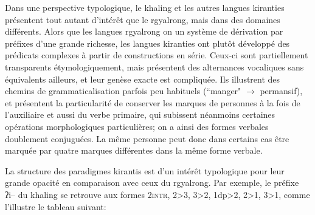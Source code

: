 \documentclass[oldfontcommands,oneside,a4paper,11pt]{memoir}
\newcommand{\ipa}[1]{{\phon #1}} %
\begin{document}
Dans une perspective typologique, le khaling et les autres langues kiranties présentent tout autant d'intérêt que le rgyalrong, mais dans des domaines différents. Alors que les langues rgyalrong on un système de dérivation par préfixes  d'une grande richesse, les langues kiranties ont plutôt développé des prédicats complexes à partir de constructions en série. Ceux-ci sont partiellement transparents étymologiquement, mais présentent des alternances vocaliques sans équivalents ailleurs, et leur genèse exacte est compliquée. Ils illustrent des chemins de grammaticalisation parfois peu habituels (``manger" $\rightarrow$ permansif), et présentent la particularité de conserver les marques de personnes à la fois de l'auxiliaire et aussi du verbe primaire, qui subissent néanmoins certaines opérations morphologiques particulières; on a ainsi des formes verbales doublement conjuguées. La même personne peut donc dans certains cas être marquée par quatre marques différentes dans la même forme verbale.


La structure des paradigmes kirantis est d'un intérêt typologique pour leur grande opacité en comparaison avec ceux du rgyalrong. Par exemple, le préfixe \ipa{ʔi--} du khaling se retrouve aux formes \textsc{2intr}, 2>3, 3>2, 1dp>2, 2>1, 3>1, comme l'illustre le tableau suivant:
\end{document}
